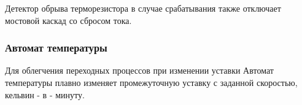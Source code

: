 Детектор обрыва терморезистора в случае срабатывания также отключает мостовой каскад со сбросом тока.


\subsubsection{Автомат температуры}

Для облегчения переходных процессов при изменении уставки Автомат температуры плавно изменяет
промежуточную уставку с заданной скоростью, кельвин - в - минуту.
